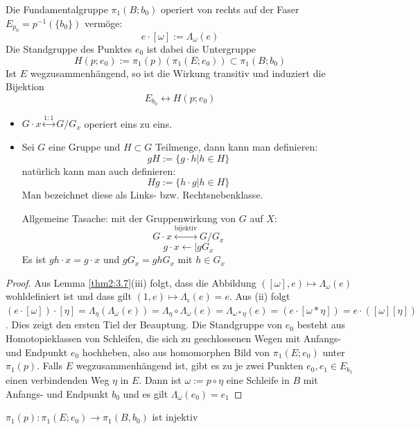 \documentclass[a4paper,10pt]{scrartcl}
\begin{document}
\begin{st}
 Die Fundamentalgruppe $\pi_1(B; b_0)$ operiert von rechts auf der Faser $E_{p_0}=p^{-1}(\{b_0\})$ vermöge:
\[
 e\cdot [\omega] := \Lambda_\omega(e)
\]
Die Standgruppe des Punktes $e_0$ ist dabei die Untergruppe
\[
 H(p;e_0):=\pi_1(p) (\pi_1(E;e_0))\subset \pi_1(B;b_0)
\]
Ist $E$ wegzusammenhängend, so ist die Wirkung transitiv und induziert die Bijektion
\[
 E_{b_0} \leftrightarrow H(p; e_0)
\]



\end{st}
\begin{note*}
\begin{itemize}
\item $G\cdot x \stackrel{1:1}{\leftrightarrow} G/G_x$ operiert eins zu eins.
\item Sei $G$ eine Gruppe und $H \subset G$ Teilmenge, dann kann man definieren:
\[
 gH:=\{g\cdot h|h \in H\}
\]
natürlich kann man auch definieren:
\[
 Hg:=\{h\cdot g|h\in H\}
\]
Man bezeichnet diese als Links- bzw. Rechtsnebenklasse.
\begin{seg}{Allgemeine Tasache:}
 mit der Gruppenwirkung von $G$ auf $X$:
\[
 G\cdot x \stackrel{\text{bijektiv}}{\longleftrightarrow} G/G_x
\]
\[
 g\cdot x \leftarrow| gG_x
\]
Es ist $gh\cdot x=g\cdot x$ und $gG_x=ghG_x$ mit $h\in G_x$
\end{seg}
\end{itemize}
\end{note*}
\begin{proof}
 Aus Lemma \ref{thm2:3.7}(iii) folgt, dass die Abbildung $([\omega], e)\mapsto \Lambda_\omega(e)$ wohldefiniert ist und dass gilt $(1,e) \mapsto \Lambda_\epsilon(e)=e$. Aus (ii) folgt $(e\cdot [\omega])\cdot [\eta]=\Lambda_{\eta}(\Lambda_\omega(e))=\Lambda_{\eta}\circ \Lambda_{\omega}(e)=\Lambda_{\omega*\eta}(e)=(e\cdot [\omega*\eta])=e\cdot ([\omega][\eta])$. Dies zeigt den ersten Tiel der Beauptung. Die Standgruppe von $e_0$ besteht aus Homotopieklassen von Schleifen, die sich zu geschlossenen Wegen mit Anfangs- und Endpunkt $e_0$ hochheben, also aus homomorphen Bild von $\pi_1(E; e_0)$ unter $\pi_1(p)$. Falls $E$ wegzusammenhängend ist, gibt es zu je zwei Punkten $e_0, e_1 \in E_{b_1}$ einen verbindenden Weg $\eta$ in $E$. Dann ist $\omega:= p \circ \eta$ eine Schleife in $B$ mit Anfangs- und Endpunkt $b_0$ und es gilt $\Lambda_{\omega}(e_0)=e_1$
\end{proof}
\begin{kor}
 $\pi_1(p): \pi_1(E; e_0)\to \pi_1(B, b_0)$ ist injektiv
\end{kor}
\end{document}
